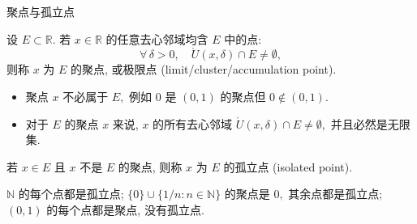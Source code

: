 \begin{frame}{聚点与孤立点}

\begin{Def}[聚点 (极限点)]
设 $E \subset \mathbb{R}.$ 若 $x \in \mathbb{R}$ 的任意去心邻域均含 $E$ 中的点:
\[
\forall\, \delta > 0,\quad \mathring{U}(x, \delta) \cap E \neq \emptyset,
\]
则称 $x$ 为 $E$ 的\alert{聚点}, 或\alert{极限点} (limit/cluster/accumulation point).
\end{Def}

\pause

\begin{attnblock}
\begin{itemize}
\item 聚点 $x$ 不必属于 $E,$ 例如 $0$ 是 $(0,1)$ 的聚点但 $0 \notin (0,1).$
\item 对于 $E$ 的聚点 $x$ 来说, $x$ 的所有去心邻域 $\mathring{U}(x, \delta) \cap E \neq \emptyset,$ 并且必然是无限集.
\end{itemize}
\end{attnblock}

\pause

\begin{Def}[孤立点]
若 $x \in E$ 且 $x$ 不是 $E$ 的聚点, 则称 $x$ 为 $E$ 的\alert{孤立点} (isolated point).
\end{Def}

\pause

\begin{eg}
$\mathbb{N}$ 的每个点都是孤立点; $\{0\} \cup \{1/n : n \in \mathbb{N}\}$ 的聚点是 $0,$ 其余点都是孤立点; $(0,1)$ 的每个点都是聚点, 没有孤立点.
\end{eg}

\end{frame}


